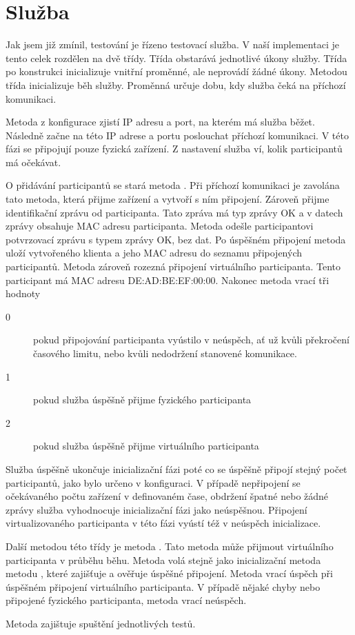 \section{Služba}
Jak jsem již zmínil, testování je řízeno testovací služba. V naší implementaci je tento celek rozdělen na dvě třídy. Třída  obstarává jednotlivé úkony služby. Třída po konstrukci inicializuje vnitřní proměnné, ale neprovádí žádné úkony. Metodou  třída inicializuje běh služby. Proměnná  určuje dobu, kdy služba čeká na příchozí komunikaci. 

Metoda z konfigurace zjistí IP adresu a port, na kterém má služba běžet. Následně začne na této IP adrese a portu poslouchat příchozí komunikaci. V této fázi se připojují pouze fyzická zařízení. Z nastavení služba ví, kolik participantů má očekávat. 

O přidávání participantů se stará metoda . Při příchozí komunikaci je zavolána tato metoda, která přijme zařízení a vytvoří s ním připojení. Zároveň přijme identifikační zprávu od participanta. Tato zpráva má typ zprávy OK a v datech zprávy obsahuje MAC adresu participanta. Metoda odešle participantovi potvrzovací zprávu s typem zprávy OK, bez dat. Po úspěšném připojení metoda uloží vytvořeného klienta a jeho MAC adresu do seznamu připojených participantů. Metoda zároveň rozezná připojení virtuálního participanta. Tento participant má MAC adresu DE:AD:BE:EF:00:00. Nakonec metoda vrací tři hodnoty
\begin{description}
    \item[0] pokud připojování participanta vyústilo v neúspěch, ať už kvůli překročení časového limitu, nebo kvůli nedodržení stanovené komunikace.
    \item[1] pokud služba úspěšně přijme fyzického participanta
    \item[2] pokud služba úspěšně přijme virtuálního participanta
\end{description}

Služba úspěšně ukončuje inicializační fázi poté co se úspěšně připojí stejný počet participantů, jako bylo určeno v konfiguraci. V případě nepřipojení se očekávaného počtu zařízení v definovaném čase, obdržení špatné nebo žádné zprávy služba vyhodnocuje inicializační fázi jako neúspěšnou. Připojení virtualizovaného participanta v této fázi vyústí též v neúspěch inicializace.

Další metodou této třídy je metoda . Tato metoda může přijmout virtuálního participanta v průběhu běhu. Metoda volá stejně jako inicializační metoda metodu , které zajišťuje a ověřuje úspěšné připojení. Metoda vrací úspěch při úspěšném připojení virtuálního participanta. V případě nějaké chyby nebo připojené fyzického participanta, metoda vrací neúspěch. 

Metoda  zajištuje spuštění jednotlivých testů. 


